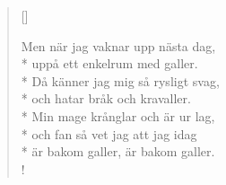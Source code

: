 \begin{verse}[\versewidth]

Men när jag vaknar upp nästa dag,\\*
uppå ett enkelrum med galler.\\*
Då känner jag mig så rysligt svag,\\*
och hatar bråk och kravaller.\\*
Min mage krånglar och är ur lag,\\*
och fan så vet jag att jag idag\\*
är bakom galler, är bakom galler.\\!




\end{verse}

